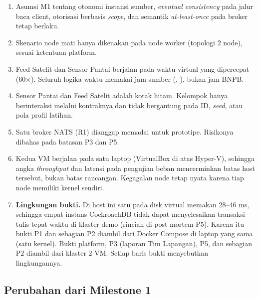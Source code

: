 \begin{enumerate}[label=\alph*.]
\item Asumsi M1 tentang otonomi instansi sumber, \textit{eventual consistency} pada jalur baca client, otorisasi berbasis \textit{scope}, dan semantik \textit{at-least-once} pada broker tetap berlaku.
\item Skenario node mati hanya dikenakan pada node worker (topologi 2 node), sesuai ketentuan platform.
\item Feed Satelit dan Sensor Pantai berjalan pada waktu virtual yang dipercepat (60$\times$). Seluruh logika waktu memakai jam sumber (, ), bukan jam BNPB.
\item Sensor Pantai dan Feed Satelit adalah kotak hitam. Kelompok hanya berinteraksi melalui kontraknya dan tidak bergantung pada ID, \textit{seed}, atau pola profil latihan.
\item Satu broker NATS (R1) dianggap memadai untuk prototipe. Risikonya dibahas pada batasan P3 dan P5.
\item Kedua VM berjalan pada satu laptop (VirtualBox di atas Hyper-V), sehingga angka \textit{throughput} dan latensi pada pengujian beban mencerminkan batas host tersebut, bukan batas rancangan. Kegagalan node tetap nyata karena tiap node memiliki kernel sendiri.
\item \textbf{Lingkungan bukti.} Di host ini satu  pada disk virtual memakan 28--46 ms, sehingga empat instans CockroachDB tidak dapat menyelesaikan transaksi tulis tepat waktu di klaster demo (rincian di post-mortem P5). Karena itu bukti P1 dan sebagian P2 diambil dari Docker Compose di laptop yang sama (satu kernel). Bukti platform, P3 (laporan Tim Lapangan), P5, dan sebagian P2 diambil dari klaster 2 VM. Setiap baris bukti menyebutkan lingkungannya.
\end{enumerate}

\subsection{Perubahan dari Milestone 1}

